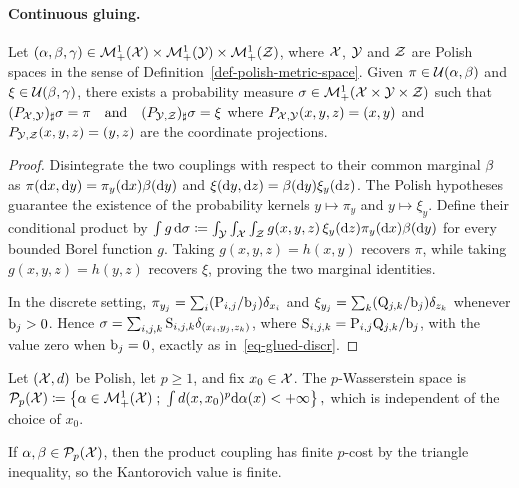 \paragraph{Continuous gluing.}
\begin{lem}\label{lem-gluing-general}
Let $(\alpha,\beta,\gamma) \in \mathcal{M}_+^1(\mathcal{X}) \times \mathcal{M}_+^1(\mathcal{Y}) \times \mathcal{M}_+^1(\mathcal{Z})$, where $\mathcal{X}$, $\mathcal{Y}$ and $\mathcal{Z}$ are Polish spaces in the sense of Definition~\ref{def-polish-metric-space}.
Given $\pi \in \mathcal{U}(\alpha,\beta)$ and $\xi \in \mathcal{U}(\beta,\gamma)$, there exists a probability measure
$\sigma \in \mathcal{M}_+^1(\mathcal{X} \times \mathcal{Y} \times \mathcal{Z})$ such that
\((P_{\mathcal{X},\mathcal{Y}})_\sharp \sigma = \pi \quad \text{and} \quad (P_{\mathcal{Y},\mathcal{Z}})_\sharp \sigma = \xi\)
where $P_{\mathcal{X},\mathcal{Y}}(x,y,z)=(x,y)$ and $P_{\mathcal{Y},\mathcal{Z}}(x,y,z)=(y,z)$ are the coordinate projections.
\end{lem}
\begin{proof}
Disintegrate the two couplings with respect to their common marginal $\beta$ as
$\pi(\mathrm{d} x,\mathrm{d} y)=\pi_y(\mathrm{d} x)\beta(\mathrm{d} y)$ and
$\xi(\mathrm{d} y,\mathrm{d} z)=\beta(\mathrm{d} y)\xi_y(\mathrm{d} z)$.
The Polish hypotheses guarantee the existence of the probability kernels $y\mapsto\pi_y$ and $y\mapsto\xi_y$. Define their conditional product by
\(\int g\,\mathrm{d}\sigma \coloneqq \int_{\mathcal{Y}}\int_{\mathcal{X}}\int_{\mathcal{Z}} g(x,y,z)\,\xi_y(\mathrm{d} z)\pi_y(\mathrm{d} x)\beta(\mathrm{d} y)\)
for every bounded Borel function $g$. Taking $g(x,y,z)=h(x,y)$ recovers $\pi$, while taking $g(x,y,z)=h(y,z)$ recovers $\xi$, proving the two marginal identities.

In the discrete setting, $\pi_{y_j}=\sum_i(\mathrm{P}_{i,j}/\mathrm{b}_j)\delta_{x_i}$ and $\xi_{y_j}=\sum_k(\mathrm{Q}_{j,k}/\mathrm{b}_j)\delta_{z_k}$ whenever $\mathrm{b}_j>0$. Hence
$\sigma=\sum_{i,j,k}\mathrm{S}_{i,j,k}\delta_{(x_i,y_j,z_k)}$, where
$\mathrm{S}_{i,j,k}=\mathrm{P}_{i,j}\mathrm{Q}_{j,k}/\mathrm{b}_j$, with the value zero when $\mathrm{b}_j=0$,
exactly as in~\eqref{eq-glued-discr}.
\end{proof}
\begin{defn}\label{def-p-wasserstein-space}
Let $(\mathcal{X},d)$ be Polish, let $p\geq1$, and fix $x_0\in\mathcal{X}$. The $p$-Wasserstein space is \(\mathcal{P}_p(\mathcal{X}) \coloneqq \left\{ \alpha\in\mathcal{M}_+^1(\mathcal{X}) \;;\; \int d(x,x_0)^p\mathrm{d}\alpha(x)<+\infty \right\},\)
which is independent of the choice of $x_0$.
\end{defn}
If $\alpha,\beta\in\mathcal{P}_p(\mathcal{X})$, then the product coupling has finite $p$-cost by the triangle inequality, so the Kantorovich value is finite.

